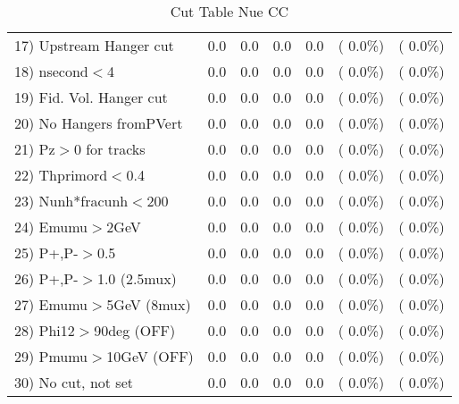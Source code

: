 \begin{table}[h!]
\begin{tabular}{||l||r|r|r|r|r|r||}
 17) Upstream Hanger cut  &          0.0 &          0.0 &          0.0 &          0.0 & (  0.0\%) & (  0.0\%) \\
 18) nsecond$<$4          &          0.0 &          0.0 &          0.0 &          0.0 & (  0.0\%) & (  0.0\%) \\
 19) Fid. Vol. Hanger cut &          0.0 &          0.0 &          0.0 &          0.0 & (  0.0\%) & (  0.0\%) \\
 20) No Hangers fromPVert &          0.0 &          0.0 &          0.0 &          0.0 & (  0.0\%) & (  0.0\%) \\
 21) Pz$>$0 for tracks    &          0.0 &          0.0 &          0.0 &          0.0 & (  0.0\%) & (  0.0\%) \\
 22) Thprimord$<$0.4      &          0.0 &          0.0 &          0.0 &          0.0 & (  0.0\%) & (  0.0\%) \\
 23) Nunh*fracunh$<$200   &          0.0 &          0.0 &          0.0 &          0.0 & (  0.0\%) & (  0.0\%) \\
 24) Emumu$>$2GeV         &          0.0 &          0.0 &          0.0 &          0.0 & (  0.0\%) & (  0.0\%) \\
 25) P+,P-$>$0.5          &          0.0 &          0.0 &          0.0 &          0.0 & (  0.0\%) & (  0.0\%) \\
 26) P+,P-$>$1.0 (2.5mux) &          0.0 &          0.0 &          0.0 &          0.0 & (  0.0\%) & (  0.0\%) \\
 27) Emumu$>$5GeV  (8mux) &          0.0 &          0.0 &          0.0 &          0.0 & (  0.0\%) & (  0.0\%) \\
 28) Phi12$>$90deg  (OFF) &          0.0 &          0.0 &          0.0 &          0.0 & (  0.0\%) & (  0.0\%) \\
 29) Pmumu$>$10GeV  (OFF) &          0.0 &          0.0 &          0.0 &          0.0 & (  0.0\%) & (  0.0\%) \\
 30) No cut, not set      &          0.0 &          0.0 &          0.0 &          0.0 & (  0.0\%) & (  0.0\%) \\
 \hline
 \hline
 \end{tabular}
 \caption{Cut Table   Nue CC  }
 \label{tab-cutheavy_neutrino_1.500}
 \end{table}
